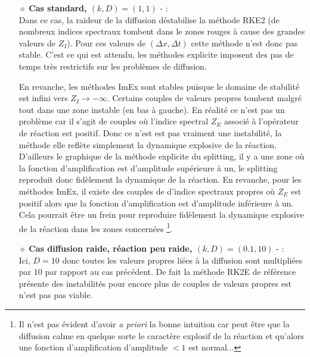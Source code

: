                 \begin{itemize}
                    \item[$\diamond$]\textbf{Cas standard, $(k,D)=(1,1)$} - :\\
                        Dans ce cas, la raideur de la diffusion déstabilise la méthode RKE2 (de nombreux indices spectraux tombent dans le zones rouges à cause des grandes valeurs de $Z_I$).
                        Pour ces valeurs de $(\Delta x, \Delta t)$ cette méthode n'est donc pas stable.
                        C'est ce qui est attendu, les méthodes explicite imposent des pas de temps très restrictifs sur les problèmes de diffusion.

                        En revanche, les méthodes ImEx sont stables puisque le domaine de stabilité est infini vers $Z_I \rightarrow -\infty$.
                        Certains couples de valeurs propres tombent malgré tout dans une zone instable (en bas à gauche). En réalité ce n'est pas un problème car il s'agit 
                        de couples où l'indice spectral $Z_E$ associé à l'opérateur de réaction est positif. Donc ce n'est est pas vraiment une instabilité, la méthode elle reflète simplement
                        la dynamique explosive de la réaction. D'ailleurs le graphique de la méthode explicite du splitting, il y a une zone 
                        où la fonction d'amplification est d'amplitude supérieure à un, le splitting reproduit donc fidèlement la dynamique de la réaction.
                        En revanche,
                        pour les méthodes ImEx, il existe des couples de d'indice spectraux propres où $Z_E$ est positif alors que la fonction d'amplification est d'amplitude inférieure à un. 
                        Cela pourrait être un frein pour reproduire fidèlement la dynamique explosive de la réaction dans les zones concernées
                        \footnote{Il n'est pas évident d'avoir \textit{a priori} la bonne intuition car peut être que la diffusion calme en quelque sorte 
                        le caractère explosif de la réaction et qu'alors une fonction d'amplification d'amplitude $< 1$ est normal...}.
                    \item[$\diamond$]\textbf{Cas diffusion raide, réaction peu raide, $(k,D)=(0.1,10)$}  - :\\
                        Ici, $D=10$ donc toutes les valeurs propres liées à la diffusion sont multipliées par 10 par rapport au cas précédent. 
                        De fait la méthode RK2E de référence présente des instabilités pour encore plus de couples de valeurs propres est n'est pas pas viable.

\end{itemize}

